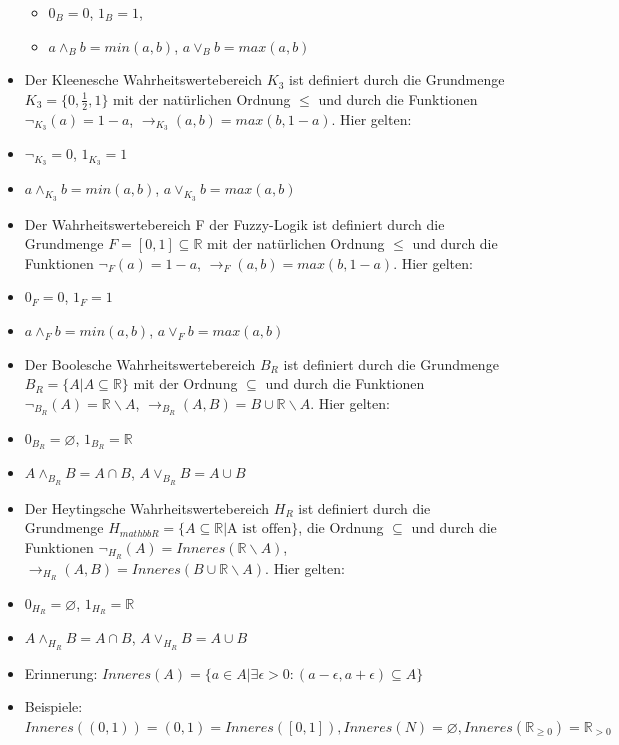\documentclass[a4paper]{article}
\begin{document}
\begin{multicols}{3}
\begin{itemize}
          \begin{itemize}
            \item
                  $0_B=0$, $1_B= 1$,
            \item
                  $a\wedge_B b= min(a,b)$, $a\vee_B b= max(a,b)$
          \end{itemize}
    \item
          Der Kleenesche Wahrheitswertebereich $K_3$ ist definiert durch die
          Grundmenge $K_3=\{0,\frac{1}{2},1\}$ mit der natürlichen Ordnung
          $\leq$ und durch die Funktionen $\lnot_{K_3} (a) = 1 -a $,
          $\rightarrow_{K_3} (a,b) = max(b, 1-a)$. Hier gelten:
    \item
          $\lnot_{K_3} = 0$, $1_{K_3} = 1$
    \item
          $a\wedge_{K_3} b= min(a,b)$, $a\vee_{K_3} b= max(a,b)$
    \item
          Der Wahrheitswertebereich F der Fuzzy-Logik ist definiert durch die
          Grundmenge $F=[0,1]\subseteq\mathbb{R}$ mit der natürlichen Ordnung
          $\leq$ und durch die Funktionen $\lnot_F (a) = 1-a$,
          $\rightarrow_F (a,b) = max(b, 1-a)$. Hier gelten:
    \item
          $0_F= 0$, $1_F= 1$
    \item
          $a\wedge_F b= min(a,b)$, $a\vee_F b= max(a,b)$
    \item
          Der Boolesche Wahrheitswertebereich $B_R$ ist definiert durch die
          Grundmenge $B_R=\{A|A\subseteq \mathbb{R}\}$ mit der Ordnung
          $\subseteq$ und durch die Funktionen
          $\lnot_{B_R} (A) =\mathbb{R}\backslash A$,
          $\rightarrow_{B_R} (A,B) = B\cup\mathbb{R}\backslash A$. Hier gelten:
    \item
          $0_{B_R}=\varnothing$, $1_{B_R}=\mathbb{R}$
    \item
          $A\wedge_{B_R} B=A\cap B$, $A\vee_{B_R} B=A\cup B$
    \item
          Der Heytingsche Wahrheitswertebereich $H_R$ ist definiert durch die
          Grundmenge
          $H_{mathbb{R}} =\{A\subseteq\mathbb{R} | \text{A ist offen}\}$, die
          Ordnung $\subseteq$ und durch die Funktionen
          $\lnot_{H_R} (A) = Inneres(\mathbb{R}\backslash A)$,
          $\rightarrow_{H_R} (A,B) =Inneres(B\cup \mathbb{R}\backslash A)$. Hier
          gelten:
    \item
          $0_{H_R}=\varnothing$, $1_{H_R}=\mathbb{R}$
    \item
          $A\wedge_{H_R} B= A\cap B$, $A\vee_{H_R} B=A\cup B$
    \item
          Erinnerung:
          $Inneres(A) =\{a\in A|\exists \epsilon > 0 : (a-\epsilon,a+\epsilon)\subseteq A\}$
    \item
          Beispiele:
          $Inneres((0,1))=(0,1)=Inneres([0,1]),Inneres(N)=\varnothing,Inneres(\mathbb{R}_{\geq 0}) = \mathbb{R}_{> 0}$
  \end{itemize}


\end{multicols}
\end{document}
